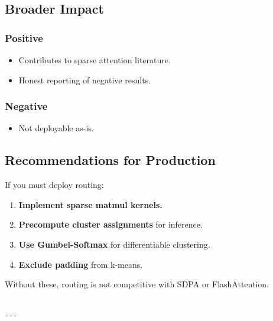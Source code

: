 \subsection{Broader Impact}

\subsubsection{Positive}

\begin{itemize}
\item Contributes to sparse attention literature.
\item Honest reporting of negative results.

\end{itemize}
\subsubsection{Negative}

\begin{itemize}
\item Not deployable as-is.

\end{itemize}
\subsection{Recommendations for Production}

If you must deploy routing:

\begin{enumerate}
\item \textbf{Implement sparse matmul kernels.}
\item \textbf{Precompute cluster assignments} for inference.
\item \textbf{Use Gumbel-Softmax} for differentiable clustering.
\item \textbf{Exclude padding} from k-means.

\end{enumerate}
Without these, routing is not competitive with SDPA or FlashAttention.
\begin{lstlisting}

---
\end{lstlisting}
